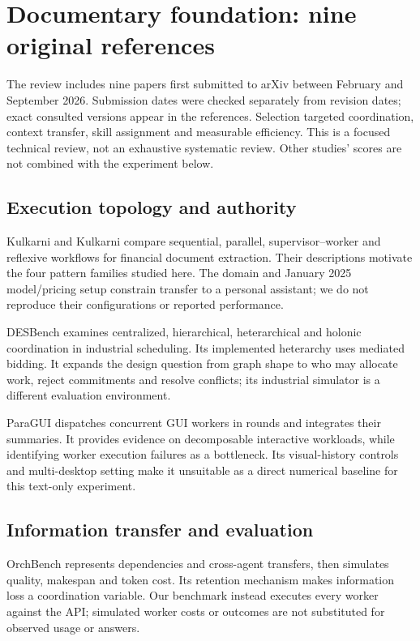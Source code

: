 \section{Documentary foundation: nine original references}
The review includes nine papers first submitted to arXiv between February and September 2026. Submission dates were checked separately from revision dates; exact consulted versions appear in the references. Selection targeted coordination, context transfer, skill assignment and measurable efficiency. This is a focused technical review, not an exhaustive systematic review. Other studies' scores are not combined with the experiment below.

\subsection{Execution topology and authority}
Kulkarni and Kulkarni compare sequential, parallel, supervisor--worker and reflexive workflows for financial document extraction. Their descriptions motivate the four pattern families studied here. The domain and January 2025 model/pricing setup constrain transfer to a personal assistant; we do not reproduce their configurations or reported performance.

DESBench examines centralized, hierarchical, heterarchical and holonic coordination in industrial scheduling. Its implemented heterarchy uses mediated bidding. It expands the design question from graph shape to who may allocate work, reject commitments and resolve conflicts; its industrial simulator is a different evaluation environment.

ParaGUI dispatches concurrent GUI workers in rounds and integrates their summaries. It provides evidence on decomposable interactive workloads, while identifying worker execution failures as a bottleneck. Its visual-history controls and multi-desktop setting make it unsuitable as a direct numerical baseline for this text-only experiment.

\subsection{Information transfer and evaluation}
OrchBench represents dependencies and cross-agent transfers, then simulates quality, makespan and token cost. Its retention mechanism makes information loss a coordination variable. Our benchmark instead executes every worker against the API; simulated worker costs or outcomes are not substituted for observed usage or answers.

